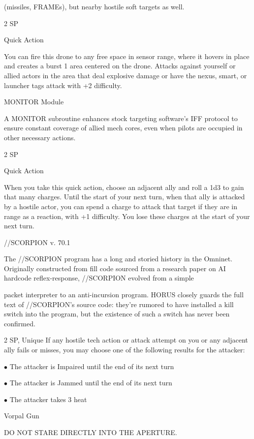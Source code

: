 (missiles, FRAMEs), but nearby hostile soft targets as well.

2 SP

Quick Action

You can fire this drone to any free space in sensor range, where it hovers in place and creates a
burst 1 area centered on the drone. Attacks against yourself or allied actors in the area that deal
explosive damage or have the nexus, smart, or launcher tags attack with +2 difficulty.


MONITOR Module

A MONITOR subroutine enhances stock targeting software’s IFF protocol to ensure constant coverage of
allied mech cores, even when pilots are occupied in other necessary actions.

2 SP

Quick Action

When you take this quick action, choose an adjacent ally and roll a 1d3 to gain that many
charges. Until the start of your next turn, when that ally is attacked by a hostile actor, you can
spend a charge to attack that target if they are in range as a reaction, with +1 difficulty. You lose
these charges at the start of your next turn.


//SCORPION v. 70.1

The //SCORPION program has a long and storied history in the Omninet. Originally constructed from fill
code sourced from a research paper on AI hardcode reflex-response, //SCORPION evolved from a simple

packet interpreter to an anti-incursion program. HORUS closely guards the full text of //SCORPION’s
source code: they’re rumored to have installed a kill switch into the program, but the existence of such a
switch has never been confirmed.

2 SP, Unique
If any hostile tech action or attack attempt on you or any adjacent ally fails or misses, you may
choose one of the following results for the attacker:

     $\bullet$    The attacker is Impaired until the end of its next turn

     $\bullet$    The attacker is Jammed until the end of its next turn





     $\bullet$    The attacker takes 3 heat


Vorpal Gun

DO NOT STARE DIRECTLY INTO THE APERTURE.

